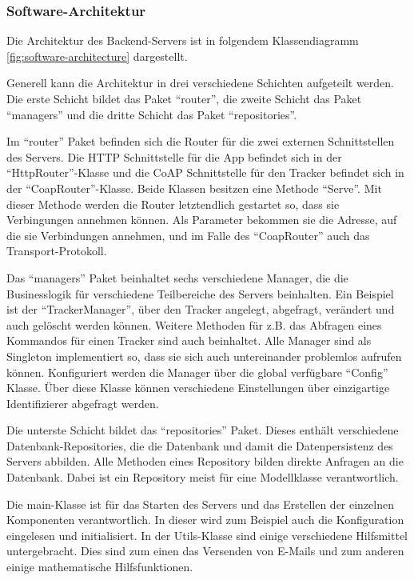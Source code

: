 \subsubsection{Software-Architektur}
\FloatBarrier
Die Architektur des Backend-Servers ist in folgendem Klassendiagramm \ref{fig:software-architecture} dargestellt.

Generell kann die Architektur in drei verschiedene Schichten aufgeteilt werden.
Die erste Schicht bildet das Paket \enquote{router}, die zweite Schicht das Paket \enquote{managers} und die dritte Schicht das Paket \enquote{repositories}.

Im \enquote{router} Paket befinden sich die Router für die zwei externen Schnittstellen des Servers.
Die \gls{HTTP} Schnittstelle für die App befindet sich in der \enquote{HttpRouter}-Klasse und die \gls{CoAP} Schnittstelle für den Tracker befindet sich in der \enquote{CoapRouter}-Klasse.
Beide Klassen besitzen eine Methode \enquote{Serve}.
Mit dieser Methode werden die Router letztendlich gestartet so, dass sie Verbingungen annehmen können.
Als Parameter bekommen sie die Adresse, auf die sie Verbindungen annehmen, und im Falle des \enquote{CoapRouter} auch das Transport-Protokoll.

Das \enquote{managers} Paket beinhaltet sechs verschiedene Manager, die die Businesslogik für verschiedene Teilbereiche des Servers beinhalten.
Ein Beispiel ist der \enquote{TrackerManager}, über den Tracker angelegt, abgefragt, verändert und auch gelöscht werden können.
Weitere Methoden für z.B. das Abfragen eines Kommandos für einen Tracker sind auch beinhaltet.
Alle Manager sind als Singleton implementiert so, dass sie sich auch untereinander problemlos aufrufen können.
Konfiguriert werden die Manager über die global verfügbare \enquote{Config} Klasse.
Über diese Klasse können verschiedene Einstellungen über einzigartige Identifizierer abgefragt werden.

Die unterste Schicht bildet das \enquote{repositories} Paket.
Dieses enthält verschiedene Datenbank-Repositories, die die Datenbank und damit die Datenpersistenz des Servers abbilden.
Alle Methoden eines Repository bilden direkte Anfragen an die Datenbank.
Dabei ist ein Repository meist für eine Modellklasse verantwortlich.

Die main-Klasse ist für das Starten des Servers und das Erstellen der einzelnen Komponenten verantwortlich.
In dieser wird zum Beispiel auch die Konfiguration eingelesen und initialisiert.
In der Utils-Klasse sind einige verschiedene Hilfsmittel untergebracht.
Dies sind zum einen das Versenden von E-Mails und zum anderen einige mathematische Hilfsfunktionen.

